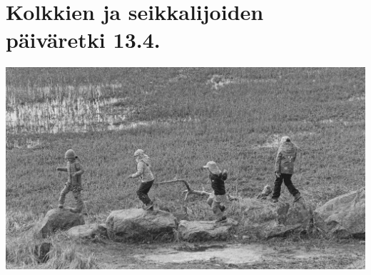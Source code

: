 
\section{Kolkkien ja seikkalijoiden päiväretki 13.4.}

\begin{center}
	\noindent\includegraphics[width=0.8\linewidth]{assets/kolkkienpäiväretkibw3}
\end{center}
\vspace*{-0.16cm}

